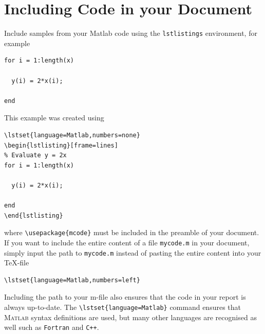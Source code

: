 \section{Including Code in your Document}
Include samples from your Matlab code using the \texttt{lstlistings} environment, for example
\lstset{language=Matlab,numbers=none}
\begin{lstlisting}[frame=lines]
% Evaluate y = 2x
for i = 1:length(x)

  y(i) = 2*x(i);

end
\end{lstlisting}
This example was created using
\begin{verbatim}
\lstset{language=Matlab,numbers=none}
\begin{lstlisting}[frame=lines]
% Evaluate y = 2x
for i = 1:length(x)

  y(i) = 2*x(i);

end
\end{lstlisting}
\end{verbatim}
where \texttt{\textbackslash usepackage\{mcode\}} must be included in the preamble of your document. If you want to include the entire content of a file \texttt{mycode.m} in your document, simply input the path to \texttt{mycode.m} instead of pasting the entire content into your \TeX -file
\begin{verbatim}
\lstset{language=Matlab,numbers=left}

\end{verbatim}
Including the path to your m-file also ensures that the code in your report is always up-to-date. The \texttt{\textbackslash lstset\{language=Matlab\}} command ensures that \textsc{Matlab} syntax definitions are used, but many other languages are recognised as well such as \texttt{Fortran} and \texttt{C++}.